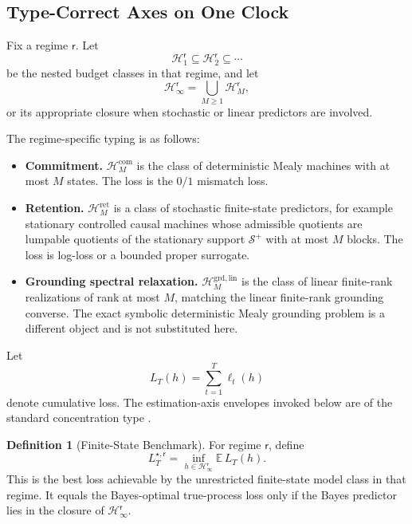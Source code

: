 \documentclass[12pt]{article}
\theoremstyle{definition}
\newtheorem{definition}[theorem]{Definition}
\newcommand{\Hcal}{\mathcal H}
\newcommand{\Splus}{\mathcal S^{+}}
\begin{document}
\subsection{Type-Correct Axes on One Clock}
\label{subsec:oracle-setup}

Fix a regime $\mathsf r$.  Let
\[
\Hcal_1^{\mathsf r}
\subseteq
\Hcal_2^{\mathsf r}
\subseteq
\cdots
\]
be the nested budget classes in that regime, and let
\[
\Hcal_\infty^{\mathsf r}
=
\bigcup_{M\ge1}\Hcal_M^{\mathsf r},
\]
or its appropriate closure when stochastic or linear predictors are involved.

The regime-specific typing is as follows:
\begin{itemize}[leftmargin=1.8em]
\item \textbf{Commitment.}
$\Hcal_M^{\mathrm{com}}$ is the class of deterministic Mealy machines with at
most $M$ states.  The loss is the $0/1$ mismatch loss.

\item \textbf{Retention.}
$\Hcal_M^{\mathrm{ret}}$ is a class of stochastic finite-state predictors,
for example stationary controlled causal machines whose admissible quotients
are lumpable quotients of the stationary support $\Splus$ with at most $M$
blocks.  The loss is log-loss or a bounded proper surrogate.

\item \textbf{Grounding spectral relaxation.}
$\Hcal_M^{\mathrm{grd,lin}}$ is the class of linear finite-rank realizations
of rank at most $M$, matching the linear finite-rank grounding converse.  The
exact symbolic deterministic Mealy grounding problem is a different object and
is not substituted here.
\end{itemize}

Let
\[
L_T(h)=\sum_{t=1}^T \ell_t(h)
\]
denote cumulative loss.  The estimation-axis envelopes invoked below are of the
standard concentration type \cite{boucheron2013}.

\begin{definition}[Finite-State Benchmark]
\label{def:finite-state-benchmark}
For regime $\mathsf r$, define
\[
L_T^{\star,\mathsf r}
=
\inf_{h\in \Hcal_\infty^{\mathsf r}}
\mathbb E\,L_T(h).
\]
This is the best loss achievable by the unrestricted finite-state model class
in that regime.  It equals the Bayes-optimal true-process loss only if the
Bayes predictor lies in the closure of $\Hcal_\infty^{\mathsf r}$.
\end{definition}
\end{document}

